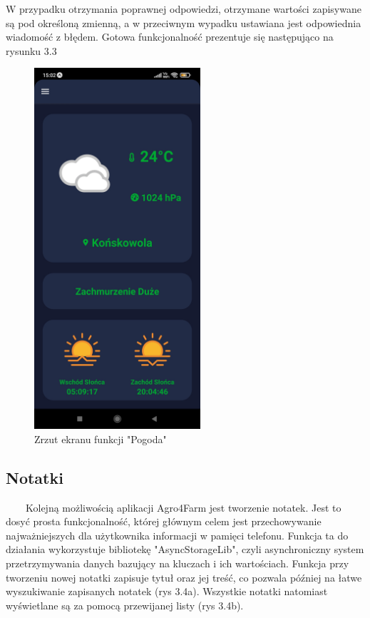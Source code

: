 \documentclass[a4paper,12pt,oneside]{book}
\begin{document}
	\newpage
	
	W przypadku otrzymania poprawnej odpowiedzi, otrzymane wartości zapisywane są pod określoną zmienną, a w przeciwnym wypadku ustawiana jest odpowiednia wiadomość z błędem. Gotowa funkcjonalność prezentuje się następująco na rysunku 3.3
	
	\begin{figure}[H]
		\centering
		\includegraphics[width=0.55\textwidth]{grafika/pogoda.jpg}
		\caption{Zrzut ekranu funkcji "Pogoda"}
	\end{figure}
	
	\subsection{Notatki}
	\ \ \ \
		Kolejną możliwością aplikacji Agro4Farm jest tworzenie notatek. Jest to dosyć prosta funkcjonalność, której głównym celem jest przechowywanie najważniejszych dla użytkownika informacji w pamięci telefonu. Funkcja ta do działania wykorzystuje bibliotekę "AsyncStorageLib", czyli asynchroniczny system przetrzymywania danych bazujący na kluczach i ich wartościach. Funkcja przy tworzeniu nowej notatki zapisuje tytuł oraz jej treść, co pozwala później na łatwe wyszukiwanie zapisanych notatek (rys 3.4a). Wszystkie notatki natomiast wyświetlane są za pomocą przewijanej listy (rys 3.4b).
		
\end{document}

